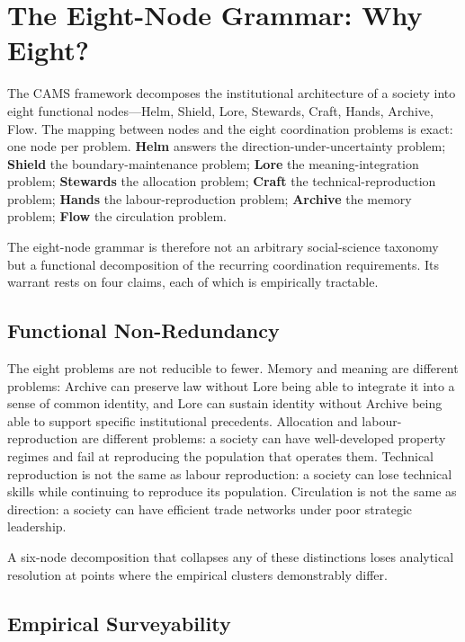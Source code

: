\documentclass[12pt,a4paper]{article}
\begin{document}
\section{The Eight-Node Grammar: Why Eight?}

The CAMS framework decomposes the institutional architecture of a society into eight functional nodes---Helm, Shield, Lore, Stewards, Craft, Hands, Archive, Flow. The mapping between nodes and the eight coordination problems is exact: one node per problem. \textbf{Helm} answers the direction-under-uncertainty problem; \textbf{Shield} the boundary-maintenance problem; \textbf{Lore} the meaning-integration problem; \textbf{Stewards} the allocation problem; \textbf{Craft} the technical-reproduction problem; \textbf{Hands} the labour-reproduction problem; \textbf{Archive} the memory problem; \textbf{Flow} the circulation problem.

The eight-node grammar is therefore not an arbitrary social-science taxonomy but a functional decomposition of the recurring coordination requirements. Its warrant rests on four claims, each of which is empirically tractable.

\subsection{Functional Non-Redundancy}

The eight problems are not reducible to fewer. Memory and meaning are different problems: Archive can preserve law without Lore being able to integrate it into a sense of common identity, and Lore can sustain identity without Archive being able to support specific institutional precedents. Allocation and labour-reproduction are different problems: a society can have well-developed property regimes and fail at reproducing the population that operates them. Technical reproduction is not the same as labour reproduction: a society can lose technical skills while continuing to reproduce its population. Circulation is not the same as direction: a society can have efficient trade networks under poor strategic leadership.

A six-node decomposition that collapses any of these distinctions loses analytical resolution at points where the empirical clusters demonstrably differ.

\subsection{Empirical Surveyability}
\end{document}
